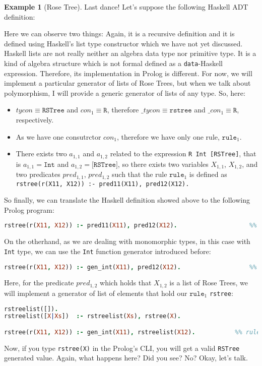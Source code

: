 \documentclass{report}
\theoremstyle{definition}
\newtheorem{example}{Example}[section]
\theoremstyle{definition}
\newcommand{\ttt}[1]{\texttt{#1}}
\begin{document}
\begin{example}[Rose Tree]
	Last dance! Let's suppose the following Haskell ADT definition:
	
	Here we can observe two things: Again, it is a recursive definition and it is defined using Haskell's list type constructor which we have not yet discussed. \\
	
	Haskell lists are not really neither an algebra data type nor primitive type. It is a kind of algebra structure which is not formal defined as a \ttt{data}-Haskell expression. Therefore, its implementation in Prolog is different. For now, we will implement a particular generator of lists of Rose Trees, but when we talk about polymorphism, I will provide a generic generator of lists of any type. So, here:
	\begin{itemize}
		\item $tycon \equiv \ttt{RSTree}$ and $con_1 \equiv \ttt{R}$, therefore $\_tycon \equiv \ttt{rstree}$ and $\_con_1 \equiv \ttt{R}$, respectively.
		\item As we have one consutrctor $con_1$, therefore we have only one rule, $\ttt{rule}_1$.
		\item There exists two $a_{1,1}$ and $a_{1,2}$ related to the expression \ttt{R Int [RSTree]}, that is $a_{1,1} = \ttt{Int}$ and $a_{1,2} = \ttt{[RSTree]}$, so there exists two variables $X_{1,1}$, $X_{1,2}$, and two predicates $pred_{1,1}$, $pred_{1,2}$ such that the rule $\ttt{rule}_1$ is defined as \\ \ttt{rstree(r(X11, X12)) :- pred11(X11), pred12(X12).}
	\end{itemize}
	So finally, we can translate the Haskell definition showed above to the following Prolog program:\\
\begin{lstlisting}[language=Prolog]
rstree(r(X11, X12)) :- pred11(X11), pred12(X12).					%% rule 1
\end{lstlisting}
On the otherhand, as we are dealing with monomorphic types, in this case with \ttt{Int} type, we can use the \ttt{Int} function generator introduced before:\\
\begin{lstlisting}[language=Prolog]
rstree(r(X11, X12)) :- gen_int(X11), pred12(X12).					%% rule 1
\end{lstlisting}
Here, for the predicate $pred_{1,2}$ which holds that $X_{1,2}$ is a list of Rose Trees, we will implement a generator of list of elements that hold our $\ttt{rule}_1$ \ttt{rstree}:
\begin{lstlisting}[language=Prolog]
rstreelist([]).
rstreelist([X|Xs]) 	:- rstreelist(Xs), rstree(X).

rstree(r(X11, X12)) :- gen_int(X11), rstreelist(X12).			%% rule 1
\end{lstlisting}
Now, if you type \ttt{rstree(X)} in the Prolog's CLI, you will get a valid \ttt{RSTree} generated value. Again, what happens here? Did you see? No? Okay, let's talk.
\end{example}
\end{document}
